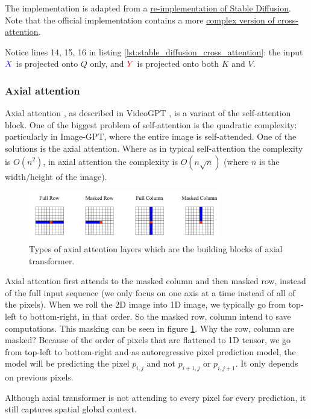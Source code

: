The implementation is adapted from a \href{https://github.com/hkproj/pytorch-stable-diffusion/blob/e0cb06de011787cdf13eed7b4287ad8410491149/sd/attention.py#L100C1-L110C28}{re-implementation of Stable Diffusion}. Note that the official implementation contains a more \href{https://github.com/CompVis/stable-diffusion/blob/21f890f9da3cfbeaba8e2ac3c425ee9e998d5229/ldm/modules/attention.py#L152}{complex version of cross-attention}.

Notice lines 14, 15, 16 in listing \ref{lst:stable_diffusion_cross_attention}: the input $\textcolor{blue}{X}$ is projected onto $Q$ only, and $\textcolor{red}{Y}$ is projected onto both $K$ and $V$.














\subsubsection{Axial attention}

Axial attention \cite{axial_attention}, as described in VideoGPT \cite{videogpt}, is a variant of the self-attention block. One of the biggest problem of self-attention is the quadratic complexity: particularly in Image-GPT, where the entire image is self-attended. One of the solutions is the axial attention. Where as in typical self-attention the complexity is $O(n^2)$, in axial attention the complexity is $O(n\sqrt{n})$ (where $n$ is the width/height of the image).

\begin{figure}
    \centering
    \includegraphics[width=0.75\textwidth]{images/appendix/attention/axial.png}
    \caption{Types of axial attention layers which are the building blocks of axial transformer.}
    \label{fig:axial_attention}
\end{figure}

Axial attention first attends to the masked column and then masked row, instead of the full input sequence (we only focus on one axis at a time instead of all of the pixels). When we roll the 2D image into 1D image, we typically go from top-left to bottom-right, in that order. So the masked row, column intend to save computations. This masking can be seen in figure \ref{fig:axial_attention}. Why the row, column are masked? Because of the order of pixels that are flattened to 1D tensor, we go from top-left to bottom-right and as autoregressive pixel prediction model, the model will be predicting the pixel $p_{i, j}$ and not $p_{i+1, j}$ or $p_{i, j+1}$. It only depends on previous pixels.

Although axial transformer is not attending to every pixel for every prediction, it still captures spatial global context.


